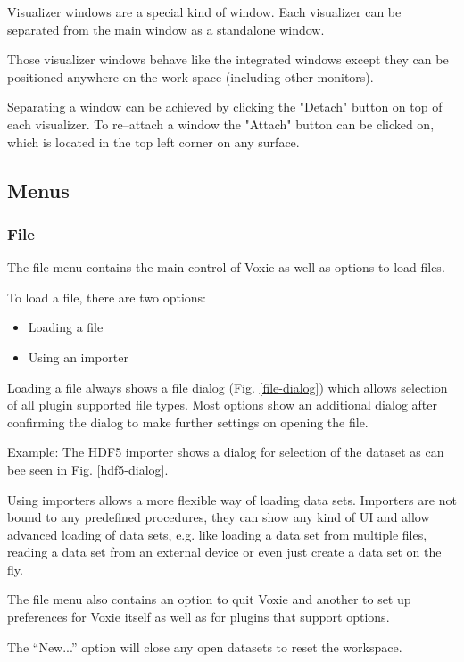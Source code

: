 Visualizer windows are a special kind of window.
Each visualizer can be separated from the main window
as a standalone window.

Those visualizer windows behave like the integrated windows
except they can be positioned anywhere on the work space
(including other monitors).

Separating a window can be achieved by clicking the "Detach" button
on top of each visualizer.
To re--attach a window the "Attach" button can be clicked on, which is located in the top left corner on any surface.

\subsection{Menus}
\label{menus}

\subsubsection{File}

The file menu contains the main control of Voxie as well as options to load
files.

To load a file, there are two options:
\begin{itemize}
  \item{Loading a file}
  \item{Using an importer}
\end{itemize}
Loading a file always shows a file dialog (Fig. \ref{file-dialog}) which allows selection of
all plugin supported file types. Most options show an additional dialog after
confirming the dialog to make further settings on opening the file.

Example:\newline
The HDF5 importer shows a dialog for selection of the dataset as can bee
seen in Fig. \ref{hdf5-dialog}.

Using importers allows a more flexible way of loading data sets.
Importers are not bound to any predefined procedures, they can show any
kind of UI and allow advanced loading of data sets, e.g. like loading a data
set from multiple files, reading a data set from an external device or 
even just create a data set on the fly.

The file menu also contains an option to quit Voxie and another to set up
preferences for Voxie itself as well as for plugins that support options.

The ``New...'' option will close any open datasets to reset the workspace.

